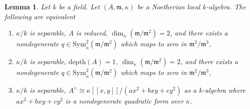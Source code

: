\documentclass{stacks-project}
\theoremstyle{plain}
\newtheorem{lemma}[subsection]{Lemma}
\theoremstyle{definition}
\theoremstyle{remark}
\numberwithin{equation}{subsection}
\begin{document}
\begin{lemma}
\label{lemma-nodal-algebraic}
Let $k$ be a field. Let $(A, \mathfrak m, \kappa)$ be a Noetherian
local $k$-algebra. The following are equivalent
\begin{enumerate}
\item $\kappa/k$ is separable, $A$ is reduced,
$\dim_\kappa(\mathfrak m/\mathfrak m^2) = 2$, and there exists a nondegenerate
$q \in \text{Sym}^2_\kappa(\mathfrak m/\mathfrak m^2)$
which maps to zero in $\mathfrak m^2/\mathfrak m^3$,
\item $\kappa/k$ is separable, $\text{depth}(A) = 1$,
$\dim_\kappa(\mathfrak m/\mathfrak m^2) = 2$, and there exists a nondegenerate
$q \in \text{Sym}^2_\kappa(\mathfrak m/\mathfrak m^2)$
which maps to zero in $\mathfrak m^2/\mathfrak m^3$,
\item $\kappa/k$ is separable,
$A^\wedge \cong \kappa[[x, y]]/(ax^2 + bxy + cy^2)$
as a $k$-algebra where $ax^2 + bxy + cy^2$ is a nondegenerate quadratic form
over $\kappa$.
\end{enumerate}
\end{lemma}
\end{document}
